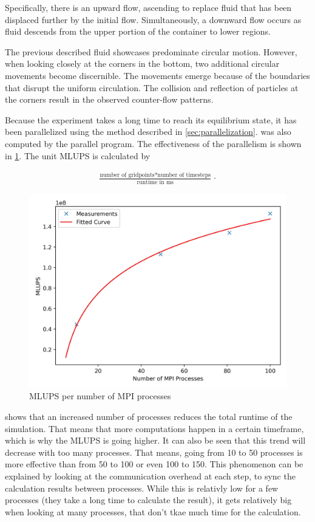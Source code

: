 Specifically, there is an upward flow, ascending to replace fluid that has been displaced further by the initial flow.
Simultaneously, a downward flow occurs as fluid descends from the upper portion of the container to lower regions.
\newline

The previous described fluid showcases predominate circular motion.
However, when looking closely at the corners in the bottom, two additional circular movements become discernible.
The movements emerge because of the boundaries that disrupt the uniform circulation.
The collision and reflection of particles at the corners result in the observed counter-flow patterns.
\newline

Because the experiment takes a long time to reach its equilibrium state, it has been parallelized using the method described in \cref{sec:parallelization}.
 was also computed by the parallel program.
The effectiveness of the parallelism is shown in \cref{fig:sl-mlups}.
The unit MLUPS is calculated by

\begin{equation*}
    \begin{aligned}
        \frac{\text{number of gridpoints} * \text{number of timesteps}}{\text{runtime in ms}} \cdot
    \end{aligned}
\end{equation*}

\begin{figure}[H]
    \begin{center}
        \includegraphics[width=0.5\linewidth]{graphs/SlidingLit/mlups}
        \caption{MLUPS per number of MPI processes}
        \label{fig:sl-mlups}
    \end{center}
\end{figure}

 shows that an increased number of processes reduces the total runtime of the simulation.
That means that more computations happen in a certain timeframe, which is why the MLUPS is going higher.
It can also be seen that this trend will decrease with too many processes.
That means, going from 10 to 50 processes is more effective than from 50 to 100 or even 100 to 150.
This phenomenon can be explained by looking at the communication overhead at each step, to sync the calculation results between processes.
While this is relativly low for a few processes (they take a long time to calculate the result), it gets relatively big when looking at many processes, that don't tkae much time for the calculation.
\newline

